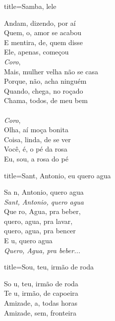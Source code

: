 \documentclass[fontsize=14pt, paper=a4, twoside, DIV=20]{scrreprt} %
\begin{document}
\begin{multicols*}{2}
\begin{song}{title={Samba, lele}}
    \begin{verse*}
        Andam, dizendo, por aí\\
        Quem, o, amor se acabou\\
        E mentira, de, quem disse\\
        Ele, apenas, começou\\
        \textit{Coro},\\
        Mais, mulher velha não se casa\\
        Porque, não, acha ninguém\\
        Quando, chega, no roçado\\
        Chama, todos, de meu bem\\
\\
        \textit{Coro},\\
        Olha, aí moça bonita\\
        Coisa, linda, de se ver\\
        Você, é, o pé da rosa\\
        Eu, sou, a rosa do pé\\
        \end{verse*}
\end{song}

\begin{song}{title={Sant, Antonio, eu quero agua}}
        \begin{verse*}
            Sa n, Antonio, quero agua\\
            \textit{Sant, Antonio, quero agua}\\
            Que ro, Agua, pra beber,\\
            quero, agua, pra lavar,\\
            quero, agua, pra bencer\\
            E u, quero agua\\
            \textit{Quero, Agua, pra beber...}\\
        \end{verse*}
\end{song}

\begin{song}{title={Sou, teu, irmão de roda}}
        \begin{verse*}
            So u, teu, irmão de roda\\
            Te u, irmão, de capoeira\\
            Amizade, a, todas horas\\
            Amizade, sem, fronteira\\
        \end{verse*}
\end{song}


\end{multicols*}
\end{document}

